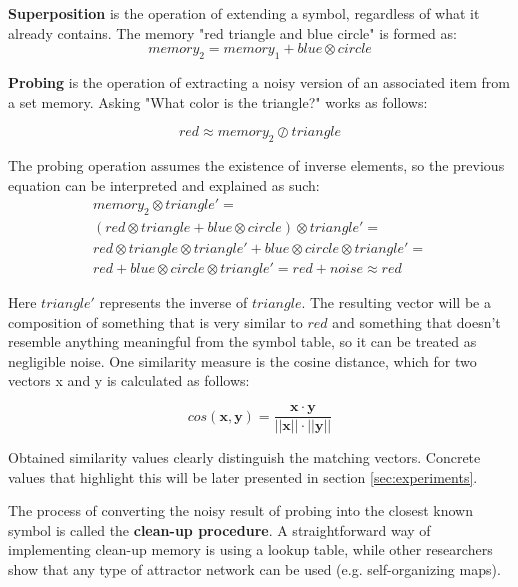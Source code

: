 \documentclass[a4paper,twoside]{article}
\begin{document}
	\textbf{Superposition} is the operation of extending a symbol, regardless of what it already contains.
The memory "red triangle and blue circle" is formed as:
	\begin{equation}
	memory_2 = memory_1 + blue \otimes circle
	\end{equation}
	
	\textbf{Probing} is the operation of extracting a noisy version of an associated item from a set memory.
Asking "What color is the triangle?" works as follows:
	
	\begin{equation}
	red \approx memory_2 \oslash triangle
	\end{equation}
	
	
	The probing operation assumes the existence of inverse elements, so the previous equation can be interpreted and explained as such:
	\begin{multline}
	memory_2 \otimes triangle'=\\
	(red \otimes triangle + blue \otimes circle) \otimes triangle'=\\
	red \otimes triangle  \otimes triangle' + blue \otimes circle \otimes triangle' =\\
	red + blue \otimes circle \otimes triangle'  = red + noise
	\approx red
	\end{multline}
	
	Here $triangle'$ represents the inverse of $triangle$.
The resulting vector will be a composition of something that is very similar to $red$ and something that doesn't resemble anything meaningful from the symbol table, so it can be treated as negligible noise. One similarity measure is the cosine distance, which for two vectors \pmb x and \pmb y is calculated as follows:
	
	\begin{equation}
cos(\pmb x, \pmb y) = \frac {\pmb x \cdot \pmb y}{||\pmb x|| \cdot ||\pmb y||}
	\end{equation} 
	
	Obtained similarity values clearly distinguish the matching vectors. Concrete values that highlight this will be later presented in section \ref{sec:experiments}.	

	The process of converting the noisy result of probing into the closest known symbol is called the \textbf{clean-up procedure}.
A straightforward way of implementing clean-up memory is using a lookup table, while other researchers show that any type of attractor network can be used (e.g. self-organizing maps).
\end{document}
